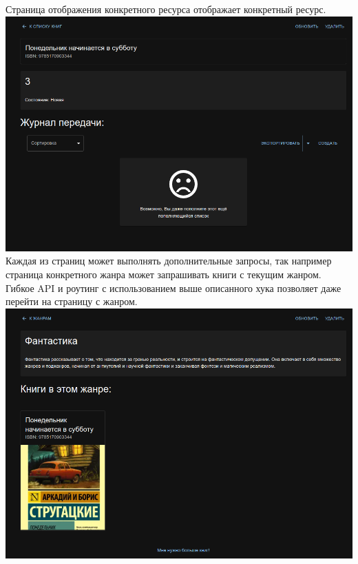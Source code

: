 \documentclass[a4paper,14pt]{extarticle}
\begin{document}
Страница отображения конкретного ресурса отображает конкретный ресурс.\\
\includegraphics[width=140mm]{view.png}\\

Каждая из страниц может выполнять дополнительные запросы, так например страница конкретного жанра
может запрашивать книги с текущим жанром. Гибкое API и роутинг с использованием выше описанного хука
позволяет даже перейти на страницу с жанром.\\
\includegraphics[width=140mm]{view2.png}\\
\end{document}
